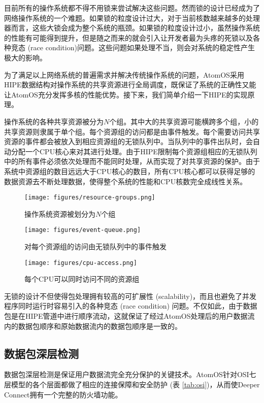 \documentclass[a4paper]{article}
\begin{document}
目前所有的操作系统都不得不用锁\cite{lock}来尝试解决这些问题。然而锁的设计已经成为了网络操作系统的一个难题。如果锁的粒度设计过大，对于当前核数越来越多的处理器而言，这些大锁会成为整个系统的瓶颈。如果锁的粒度设计过小，虽然操作系统的性能有可能得到提升，但是随之而来的就会引入让开发者最为头疼的死锁以及各种竞态 (race condition)问题。这些问题如果处理不当，则会对系统的稳定性产生极大的影响。

为了满足以上网络系统的普遍需求并解决传统操作系统的问题，AtomOS采用HIPE数据结构对操作系统的共享资源进行全局调度，既保证了系统的正确性又能让AtomOS充分发挥多核的性能优势。接下来，我们简单介绍一下HIPE的实现原理。

操作系统的各种共享资源被分为$N$个组。其中大的共享资源可能横跨多个组，小的共享资源则隶属于单个组。每个资源组的访问都是由事件触发。每个需要访问共享资源的事件都会被放入到相应资源组的无锁队列中。当队列中的事件出队时，会自动分配一个CPU核心来对其进行处理。由于HIPE限制每个资源组相应的无锁队列中的所有事件必须依次处理而不能同时处理，从而实现了对共享资源的保护。由于系统中资源组的数目远远大于CPU核心的数目，所有CPU核心都可以获得足够的数据资源去不断处理数据，使得整个系统的性能和CPU核数完全成线性关系。

\begin{figure}[hhhh]
\centering
\texttt{[image: figures/resource-groups.png]}
\caption{操作系统资源被划分为$N$个组}
\label{fig:resource-groups}
\end{figure}

\begin{figure}[hhhh]
\centering
\texttt{[image: figures/event-queue.png]}
\caption{对每个资源组的访问由无锁队列中的事件触发}
\label{fig:event-queue}
\end{figure}

\begin{figure}[hhhh]
\centering
\texttt{[image: figures/cpu-access.png]}
\caption{每个CPU可以同时访问不同的资源组}
\label{fig:cpu-access}
\end{figure}

无锁的设计不但使得包处理拥有较高的可扩展性 (scalability)，而且也避免了并发程序同时运行时容易引入的各种竞态 (race condition) 问题。不仅如此，由于数据包是在HIPE管道中进行顺序流动，这就保证了经过AtomOS处理后的用户数据流内的数据包顺序和原始数据流内的数据包顺序是一致的。

\subsection{数据包深层检测}
\label{sec:packet-inspection}
数据包深层检测是保证用户数据流完全充分保护的关键技术。AtomOS针对OSI七层模型的各个层面都做了相应的连接保障和安全防护 (表 \ref{tab:osi})，从而使Deeper Connect拥有一个完整的防火墙功能。
\end{document}
